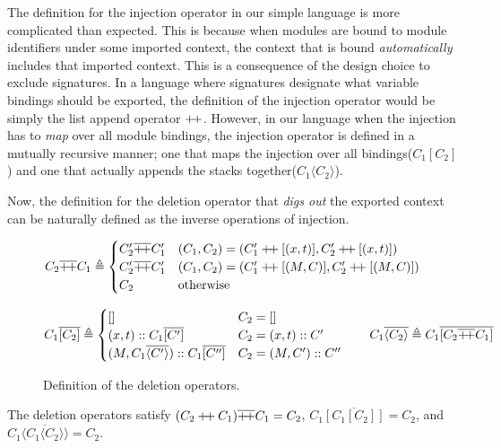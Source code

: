 \documentclass[acmsmall,review]{acmart}\settopmatter{printfolios=true,printccs=false,printacmref=false}
\theoremstyle{definition}
\newcommand*{\cons}{::}
\newcommand*{\doubleplus}{\ensuremath{\mathbin{+\mkern-3mu+}}}
\newcommand*{\mapinject}[2]{{#1}[{#2}]}
\newcommand*{\inject}[2]{{#1}\langle{#2}\rangle}
\newcommand*{\deletepre}[2]{{#2}\overline{\doubleplus}{#1}}
\newcommand*{\deletemap}[2]{{#1}\overline{[{#2}]}}
\newcommand*{\delete}[2]{{#1}\overline{\langle{#2}\rangle}}
\begin{document}
The definition for the injection operator in our simple language is more complicated than expected.
This is because when modules are bound to module identifiers under some imported context, the context that is bound \emph{automatically} includes that imported context.
This is a consequence of the design choice to exclude signatures.
In a language where signatures designate what variable bindings should be exported, the definition of the injection operator would be simply the list append operator $\doubleplus$.
However, in our language when the injection has to \emph{map} over all module bindings, the injection operator is defined in a mutually recursive manner; one that maps the injection over all bindings($\mapinject{C_1}{C_2}$) and one that actually appends the stacks together($\inject{C_1}{C_2}$).

Now, the definition for the deletion operator that \emph{digs out} the exported context can be naturally defined as the inverse operations of injection.
\begin{figure}[h!]
  \footnotesize
  \[
    \deletepre{C_{1}}{C_{2}}\triangleq
    \begin{cases}
      \deletepre{C_{1}'}{C_{2}'} & (C_{1},C_{2})=(C_{1}'\doubleplus[(x,t)],C_{2}'\doubleplus[(x,t)]) \\
      \deletepre{C_{1}'}{C_{2}'} & (C_{1},C_{2})=(C_{1}'\doubleplus[(M,C)],C_{2}'\doubleplus[(M,C)]) \\
      C_{2}                      & \text{otherwise}
    \end{cases}
  \]

  \[
    \deletemap{C_{1}}{C_{2}}\triangleq
    \begin{cases}
      []                                                 & C_{2}=[]               \\
      (x,t)\cons\deletemap{C_{1}}{C'}                    & C_{2}=(x,t):: C'       \\
      (M, \delete{C_{1}}{C'})\cons\deletemap{C_{1}}{C''} & C_{2}=(M, C')\cons C''
    \end{cases}
    \qquad
    \delete{C_{1}}{C_{2}}\triangleq \deletemap{C_{1}}{\deletepre{C_{1}}{C_{2}}}
  \]
  \caption{Definition of the deletion operators.}
  \label{fig:concdelete}
\end{figure}

The deletion operators satisfy $\deletepre{C_1}{(C_2\doubleplus C_1)}=C_2$, $\deletemap{C_1}{\mapinject{C_1}{C_2}}=C_2$, and $\delete{C_1}{\inject{C_1}{C_2}}=C_2$.
\end{document}
